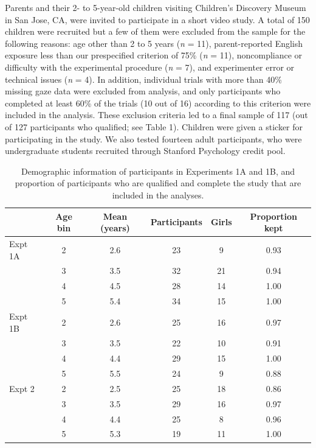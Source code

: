 \documentclass[a4paper,man,apacite,floatsintext]{apa6}
\begin{document}
Parents and their 2- to 5-year-old children visiting Children's
Discovery Museum in San Jose, CA, were invited to participate in a short
video study. A total of 150 children were recruited but a few of them
were excluded from the sample for the following reasons: age other than
2 to 5 years (\emph{n} = 11), parent-reported English exposure less than
our prespecified criterion of 75\% (\emph{n} = 11), noncompliance or
difficulty with the experimental procedure (\emph{n} = 7), and
experimenter error or technical issues (\emph{n} = 4). In addition,
individual trials with more than 40\% missing gaze data were excluded
from analysis, and only participants who completed at least 60\% of the
trials (10 out of 16) according to this criterion were included in the
analysis. These exclusion criteria led to a final sample of 117 (out of
127 participants who qualified; see Table 1). Children were given a
sticker for participating in the study. We also tested fourteen adult
participants, who were undergraduate students recruited through Stanford
Psychology credit pool.

\begin{table}[tb]
\centering
\begin{tabular}{lccccc}
  & Age bin & Mean (years) & Participants & Girls & Proportion kept \\ 
  \hline
Expt 1A & 2 & 2.6 & 23 & 9 & 0.93 \\ 
    & 3 & 3.5 & 32 & 21 & 0.94 \\ 
    & 4 & 4.5 & 28 & 14 & 1.00 \\ 
    & 5 & 5.4 & 34 & 15 & 1.00 \\ 
  Expt 1B & 2 & 2.6 & 25 & 16 & 0.97 \\ 
    & 3 & 3.5 & 22 & 10 & 0.91 \\ 
    & 4 & 4.4 & 29 & 15 & 1.00 \\ 
    & 5 & 5.5 & 24 & 9 & 0.88 \\ 
  Expt 2 & 2 & 2.5 & 25 & 18 & 0.86 \\ 
    & 3 & 3.5 & 29 & 16 & 0.97 \\ 
    & 4 & 4.4 & 25 & 8 & 0.96 \\ 
    & 5 & 5.3 & 19 & 11 & 1.00 \\ 
   \hline
\end{tabular}
\caption{Demographic information of participants in Experiments 1A and 1B, and proportion of participants who are qualified and complete the study that are included in the analyses.} 
\label{tab:exp1_summary}
\end{table}
\end{document}
